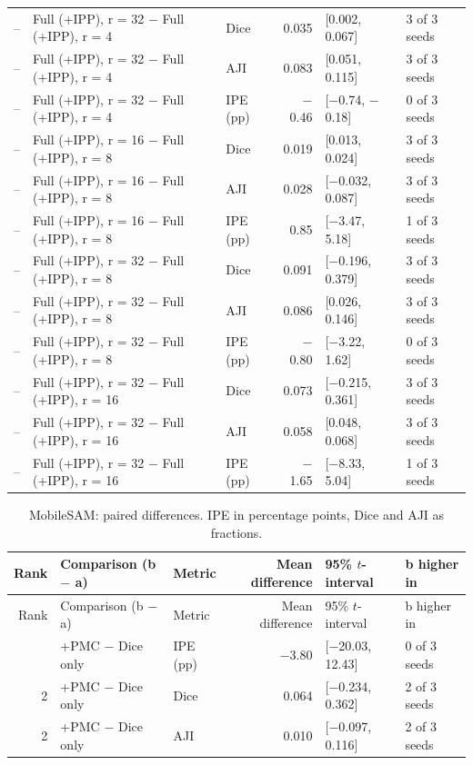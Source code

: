 \documentclass[10pt]{article}
\begin{document}
\begin{landscape}
{\begin{longtable}{r l l r l l}
-- & Full (+IPP), r = 32 $-$ Full (+IPP), r = 4 & Dice & 0.035 & [0.002, 0.067] & 3 of 3 seeds \\
-- & Full (+IPP), r = 32 $-$ Full (+IPP), r = 4 & AJI & 0.083 & [0.051, 0.115] & 3 of 3 seeds \\
-- & Full (+IPP), r = 32 $-$ Full (+IPP), r = 4 & IPE (pp) & $-$0.46 & [$-$0.74, $-$0.18] & 0 of 3 seeds \\
-- & Full (+IPP), r = 16 $-$ Full (+IPP), r = 8 & Dice & 0.019 & [0.013, 0.024] & 3 of 3 seeds \\
-- & Full (+IPP), r = 16 $-$ Full (+IPP), r = 8 & AJI & 0.028 & [$-$0.032, 0.087] & 3 of 3 seeds \\
-- & Full (+IPP), r = 16 $-$ Full (+IPP), r = 8 & IPE (pp) & 0.85 & [$-$3.47, 5.18] & 1 of 3 seeds \\
-- & Full (+IPP), r = 32 $-$ Full (+IPP), r = 8 & Dice & 0.091 & [$-$0.196, 0.379] & 3 of 3 seeds \\
-- & Full (+IPP), r = 32 $-$ Full (+IPP), r = 8 & AJI & 0.086 & [0.026, 0.146] & 3 of 3 seeds \\
-- & Full (+IPP), r = 32 $-$ Full (+IPP), r = 8 & IPE (pp) & $-$0.80 & [$-$3.22, 1.62] & 0 of 3 seeds \\
-- & Full (+IPP), r = 32 $-$ Full (+IPP), r = 16 & Dice & 0.073 & [$-$0.215, 0.361] & 3 of 3 seeds \\
-- & Full (+IPP), r = 32 $-$ Full (+IPP), r = 16 & AJI & 0.058 & [0.048, 0.068] & 3 of 3 seeds \\
-- & Full (+IPP), r = 32 $-$ Full (+IPP), r = 16 & IPE (pp) & $-$1.65 & [$-$8.33, 5.04] & 1 of 3 seeds \\
\end{longtable}
}
{\footnotesize
\begin{longtable}{r l l r l l}
\caption{MobileSAM: paired differences. IPE in percentage points, Dice and AJI as fractions.}\label{tab:pair_mobile_sam}\\
\toprule
Rank & Comparison (b $-$ a) & Metric & Mean difference & 95\% $t$-interval & b higher in \\
\midrule
\endfirsthead
\toprule
Rank & Comparison (b $-$ a) & Metric & Mean difference & 95\% $t$-interval & b higher in \\
\midrule
\endhead
\bottomrule
\endfoot
2 & +PMC $-$ Dice only & IPE (pp) & $-$3.80 & [$-$20.03, 12.43] & 0 of 3 seeds \\
2 & +PMC $-$ Dice only & Dice & 0.064 & [$-$0.234, 0.362] & 2 of 3 seeds \\
2 & +PMC $-$ Dice only & AJI & 0.010 & [$-$0.097, 0.116] & 2 of 3 seeds \\

\end{longtable}}
\end{landscape}
\end{document}
